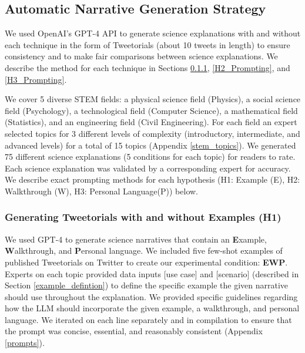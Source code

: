 
\subsection{Automatic Narrative Generation Strategy}
\label{narrative_generation_strategy}

We used OpenAI's GPT-4 API to generate science explanations with and without each technique in the form of Tweetorials (about 10 tweets in length) to ensure consistency and to make fair comparisons between science explanations. We describe the method for each technique in Sections \ref{H1_Prompting}, \ref{H2_Prompting}, and \ref{H3_Prompting}.


We cover 5 diverse STEM fields: a physical science field (Physics), a social science field (Psychology), a technological field (Computer Science), a mathematical field (Statistics), and an engineering field (Civil Engineering). For each field an expert selected topics for 3 different levels of complexity (introductory, intermediate, and advanced levels) for a total of 15 topics (Appendix \ref{stem_topics}). We generated 75 different science explanations (5 conditions for each topic) for readers to rate. Each science explanation was validated by a corresponding expert for accuracy. We describe exact prompting methods for each hypothesis (H1: Example (E), H2: Walkthrough (W), H3: Personal Language(P)) below.

\subsubsection{Generating Tweetorials with and without Examples (H1)} 
\label{H1_Prompting}

We used GPT-4 to generate science narratives that contain an \textbf{E}xample, \textbf{W}alkthrough, and \textbf{P}ersonal language. We included five few-shot examples of published Tweetorials on Twitter to create our experimental condition: \textbf{EWP}. Experts on each topic provided data inputs [use case] and [scenario] (described in Section \ref{example_defintion}) to define the specific example the given narrative should use throughout the explanation. We provided specific guidelines regarding how the LLM should incorporate the given example, a walkthrough, and personal language. We iterated on each line separately and in compilation to ensure that the prompt was concise, essential, and reasonably consistent (Appendix \ref{prompts}). 

